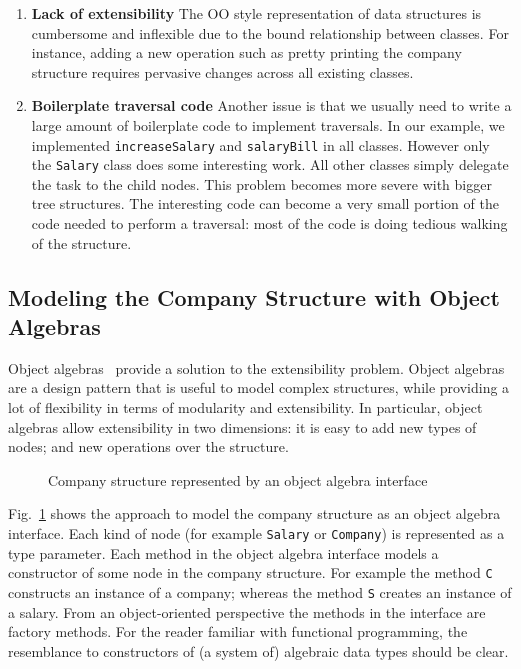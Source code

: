 \begin{enumerate}

\item {\bf Lack of extensibility} The OO style
  representation of data structures is cumbersome and
  inflexible due to the bound relationship between classes. For
  instance, adding a new operation such as pretty
  printing the company structure requires pervasive changes across all
  existing classes.

\item {\bf Boilerplate traversal code} Another issue is that we
  usually need to write a large amount of boilerplate code to
  implement traversals. In our example, we implemented
  \lstinline{increaseSalary} and \lstinline{salaryBill} in all
  classes. However only the \lstinline{Salary} class does some
  interesting work. All other classes simply delegate the task to the
  child nodes. This problem becomes more severe with bigger tree
  structures. The interesting code can become a very small portion of
  the code needed to perform a traversal: most of the code is doing
  tedious walking of the structure.

\end{enumerate}

\subsection{Modeling the Company Structure with Object Algebras}

Object algebras~\cite{bruno12oa} provide a solution to the extensibility problem.
Object algebras are a design pattern that is useful to model complex
structures, while providing a lot of flexibility in terms of
modularity and extensibility. In particular, object algebras allow
extensibility in two dimensions: it is easy to add new types of
nodes; and new operations over the structure.

\begin{figure}[tb]
\nocaptionrule
\caption{Company structure represented by an object algebra interface}
\label{syb_tree}
\end{figure}

Fig.~\ref{syb_tree} shows the approach to model the company
structure as an object algebra interface. Each kind of node (for
example \lstinline{Salary} or \lstinline{Company}) is represented as a
type parameter. Each method in the object algebra interface models a
constructor of some node in the company structure. For example the
method \lstinline{C} constructs an instance of a company; whereas the
method \lstinline{S} creates an instance of a salary. From an
object-oriented perspective the methods in the interface are factory
methods. For the reader familiar with functional programming, the
resemblance to constructors of  (a system of) algebraic data types should be clear.

